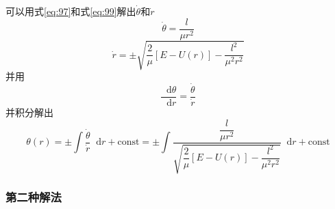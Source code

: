 \documentclass{article}
\newcommand*{\dif}{\mathop{}\!\mathrm{d}}
\begin{document}
可以用式\ref{eq:97}和式\ref{eq:99}解出$\dot{\theta}$和$\dot{r}$
\begin{equation}
  \label{eq:100}
  \dot{\theta} = \dfrac{l}{\mu r^{2}} 
\end{equation}
\begin{equation}
  \label{eq:101}
  \dot{r} = \pm \sqrt{\dfrac{2}{\mu} \left[ E - U(r) \right] - \dfrac{l^{2}}{\mu^{2} r^{2}} }
\end{equation}
并用
\begin{equation}
  \label{eq:102}
  \dfrac{\dif \theta}{\dif r} = \dfrac{\dot{\theta}}{\dot{r}} 
\end{equation}
并积分解出
\begin{equation}
  \label{eq:103}
  \theta (r) = \pm \int \dfrac{\dot{\theta}}{\dot{r}} \dif r + \mathrm{const}= \pm \int \dfrac{\dfrac{l}{\mu r^{2}}}{\sqrt{\dfrac{2}{\mu} \left[ E - U(r) \right] - \dfrac{l^{2}}{\mu^{2} r^{2}} }} \dif r + \mathrm{const}
\end{equation}

\subsubsection{第二种解法}
\end{document}
